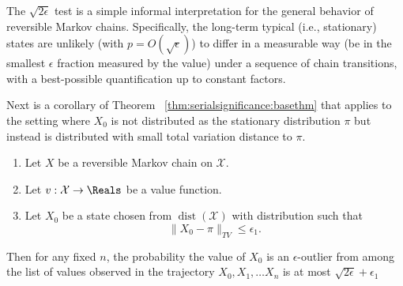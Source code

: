 \documentclass[12pt]{article}
\begin{document}
\begin{example}
\begin{remark}
    The \( \sqrt{2\epsilon} \) test is a simple informal interpretation
    for the general behavior of reversible Markov chains.  Specifically,
    the long-term typical (i.e., stationary) states are unlikely (with \(
    p = O(\sqrt{\epsilon}) \)) to differ in a measurable way (be in the
    smallest \( \epsilon \) fraction measured by the value) under a
    sequence of chain transitions, with a best-possible quantification
    up to constant factors.
\end{remark}

Next is a corollary of Theorem~%
\ref{thm:serialsignificance:basethm} that applies to the setting where \(
X_0 \) is not distributed as the stationary distribution \( \pi \) but
instead is distributed with small total variation distance to \( \pi \).

\begin{corollary}
    \begin{enumerate}
        \item
            Let \( X \) be a reversible Markov chain on \( \mathcal{X} \).
        \item
            Let \( v :  \mathcal{X} \to \Reals \) be a value function.
        \item
            Let \( X_0 \) be a state chosen from \(
            \operatorname{dist}
            (\mathcal{X}) \) with distribution such that
            \[
                \| X_0 - \pi \|_{TV} \le \epsilon_1.
            \]
    \end{enumerate}
    Then for any fixed \( n \), the probability the value of \( X_0 \)
    is an \( \epsilon \)-outlier from among the list of values observed
    in the trajectory \( X_0, X_1, \dots X_n \) is at most \( \sqrt{2\epsilon}
    + \epsilon_1 \)
\end{corollary}


\end{example}
\end{document}
